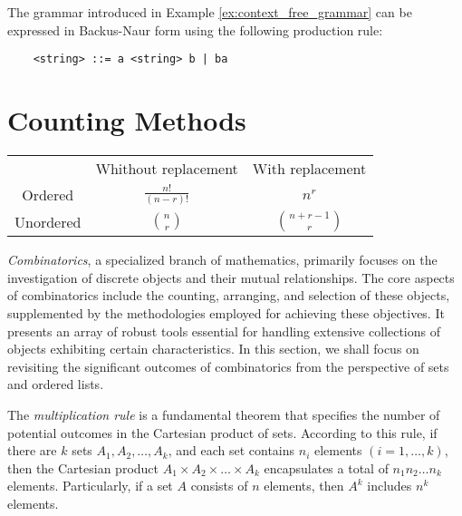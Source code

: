 \begin{example}
The grammar introduced in Example \ref{ex:context_free_grammar} can be expressed in Backus-Naur form using the following production rule:
\begin{verbatim}
    <string> ::= a <string> b | ba
\end{verbatim}
\end{example}

%
%

\section{Counting Methods}
\label{sec:counting}

{\color{red}
\begin{center}
\begin{tabular}{ c c c }
  & Whithout replacement & With replacement \\ 
 Ordered    & $\frac{n!}{(n-r)!}$ & $n^r$ \\  
 Unordered & $\binom{n}{r}$ & $\binom{n+r-1}{r}$    
\end{tabular}
\end{center}
}

\emph{Combinatorics}, a specialized branch of mathematics, primarily focuses on the investigation of discrete objects and their mutual relationships. The core aspects of combinatorics include the counting, arranging, and selection of these objects, supplemented by the methodologies employed for achieving these objectives. It presents an array of robust tools essential for handling extensive collections of objects exhibiting certain characteristics. In this section, we shall focus on revisiting the significant outcomes of combinatorics from the perspective of sets and ordered lists.

The \emph{multiplication rule} is a fundamental theorem that specifies the number of potential outcomes in the Cartesian product of sets. According to this rule, if there are $k$ sets $A_1, A_2, \ldots, A_k$, and each set contains $n_i$ elements $\left( i=1, \ldots, k \right)$, then the Cartesian product $A_1 \times A_2 \times \ldots \times A_k$ encapsulates a total of $n_1 n_2 \ldots n_k$ elements. Particularly, if a set $A$ consists of $n$ elements, then $A^k$ includes $n^k$ elements.

